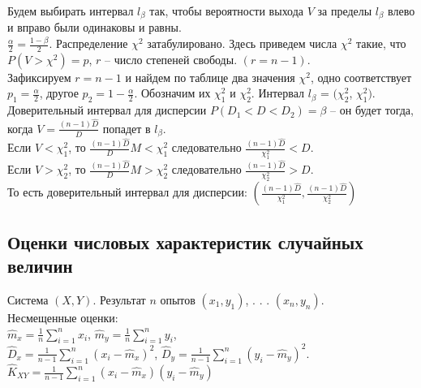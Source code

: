 \documentclass[russian, 12pt, fleqn]{article}
\begin{document}
Будем выбирать интервал $l_\beta$ так, чтобы вероятности выхода $V$ за пределы  $l_\beta$ влево и вправо были одинаковы  и равны.\\
$\frac{\alpha}{2} = \frac{1 - \beta}{2}$. Распределение $\chi^2$ затабулировано. Здесь приведем числа $\chi^2$ такие, что $P(V> \chi^2) = p$, $r$ -- число степеней свободы.
$(r = n - 1)$.\\
Зафиксируем $r = n - 1$ и найдем по таблице два значения  $\chi^2$, одно соответствует $p_1 = \frac{\alpha}{2}$, другое $p_2 = 1 - \frac{\alpha}{2}$. Обозначим их $\chi_1^2$ и  $\chi_2^2$. Интервал $l_\beta$ = $ (\chi_2^2$, $\chi_1^2)$.\\
Доверительный интервал для дисперсии $P(D_1 < D < D_2) = \beta$ -- он будет тогда, когда $V = \frac{(n - 1) \hat{D}}{D}$ попадет в $l_\beta$.\\
Если $V < \chi_1^2$, то $\frac{(n - 1) \hat{D}}{D}M  < \chi_1^2$ следовательно $\frac{(n - 1) \hat{D}}{\chi_1^2} < D$.\\
Если $V > \chi_2^2$, то $\frac{(n - 1) \hat{D}}{D}M  > \chi_2^2$ следовательно $\frac{(n - 1) \hat{D}}{\chi_2^2} > D$.\\
То есть доверительный интервал для дисперсии: $\displaystyle{\left(\frac{(n - 1) \hat{D}}{\chi_1^2}, \frac{(n - 1) \hat{D}}{\chi_2^2}\right)}$
\subsection{Оценки числовых характеристик случайных величин}
Система $(X, Y)$. Результат $n$ опытов $(x_1, y_1)$, . . . $(x_n, y_n)$.\\
Несмещенные оценки:\\
$\hat{m}_x= \frac{1}{n} \displaystyle{\sum\limits_{i = 1} ^{n}} x_i$,  $\hat{m}_y= \frac{1}{n} \displaystyle{\sum\limits_{i = 1} ^{n}} y_i$,\\
$\hat{D}_x = \frac{1}{n - 1} \displaystyle{\sum\limits_{i = 1} ^{n}} (x_i - \hat{m}_x)^2$, 
$\hat{D}_y  = \frac{1}{n - 1} \displaystyle{\sum\limits_{i = 1} ^{n}} (y_i - \hat{m}_y)^2$.\\
$\hat{K}_{XY} = \frac{1}{n - 1} \displaystyle{\sum\limits_{i = 1} ^{n}} (x_i - \hat{m}_x) (y_i - \hat{m}_y)$ 
\end{document}
